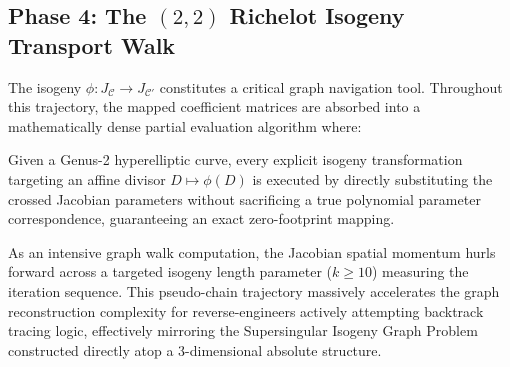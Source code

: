 \subsection{Phase 4: The $(2,2)$ Richelot Isogeny Transport Walk}
The isogeny $\phi: J_\mathcal{C} \to J_{\mathcal{C}'}$ constitutes a critical graph navigation tool. Throughout this trajectory, the mapped coefficient matrices are absorbed into a mathematically dense partial evaluation algorithm where:
\begin{theorem}
Given a Genus-2 hyperelliptic curve, every explicit isogeny transformation targeting an affine divisor $D \mapsto \phi(D)$ is executed by directly substituting the crossed Jacobian parameters without sacrificing a true polynomial parameter correspondence, guaranteeing an exact zero-footprint mapping.
\end{theorem}
As an intensive graph walk computation, the Jacobian spatial momentum hurls forward across a targeted isogeny length parameter ($k \ge 10$) measuring the iteration sequence. This pseudo-chain trajectory massively accelerates the graph reconstruction complexity for reverse-engineers actively attempting backtrack tracing logic, effectively mirroring the Supersingular Isogeny Graph Problem constructed directly atop a 3-dimensional absolute structure.
